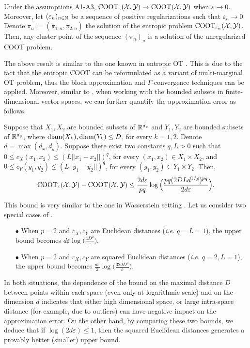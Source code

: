 \begin{proposition} \label{conv_ent_coot}
  Under the assumptions A1-A3, $\text{COOT}_{\varepsilon}(\mathcal X, \mathcal Y) \to \text{COOT}(\mathcal X, \mathcal Y)$
  when $\varepsilon \to 0$. Moreover, let $(\varepsilon_n)_{n \in \mathbb N}$ be a sequence of
  positive regularizations such that $\varepsilon_n \to 0$.
  Denote $\pi_n := (\pi_{1, n}, \pi_{2, n})$ the solution of the entropic problem
  $\text{COOT}_{\varepsilon_n} (\mathcal X, \mathcal Y)$. Then, any cluster point of the sequence $(\pi_n)_n$ is
  a solution of the unregularized COOT problem.
\end{proposition}
The above result is similar to the one known in entropic OT \citep{Carlier17}. This is due to the fact
that the entropic COOT can be reformulated as a variant of multi-marginal OT problem,
thus the block approximation and $\Gamma$-convergence techniques can be applied. Moreover,
similar to \citep{Genevay19}, when working with the bounded subsets in finite-dimensional vector spaces,
we can further quantify the approximation error as follows.
\begin{proposition} \label{prop:quant_bound_ent}
  Suppose that $X_1, X_2$ are bounded subsets of $\mathbb R^{d_x}$ and $Y_1, Y_2$ are bounded subsets
  of $\mathbb R^{d_y}$, where $\text{diam}(X_k), \text{diam}(Y_k) \leq D$, for every $k=1,2$.
  Denote $d = \max(d_x, d_y)$. Suppose there exist two constants $q, L > 0$ such that
  $0 \leq c_X(x_1, x_2) \leq (L \vert\vert x_1 - x_2 \vert\vert)^q$,
  for every $(x_1,x_2) \in X_1 \times X_2$, and
  $0 \leq c_Y(y_1, y_2) \leq (L \vert\vert y_1 - y_2 \vert\vert)^q$,
  for every $(y_1,y_2) \in Y_1 \times Y_2$. Then,
  \begin{equation}
    \text{COOT}_{\varepsilon}(\mathcal X, \mathcal Y) - \text{COOT}(\mathcal X, \mathcal Y) \leq
    \frac{2d \varepsilon}{pq} \log\Big( \frac{pq (2DLd^{1/p})^{pq}}{2d \varepsilon} \Big).
  \end{equation}
\end{proposition}
This bound is very similar to the one in Wasserstein setting \citep{Genevay19}.
Let us consider two special cases of .
\begin{itemize}
  \item[$\bullet$] When $p=2$ and $c_X, c_Y$ are Euclidean distances (\textit{i.e.} $q=L=1$),
  the upper bound becomes $d\varepsilon \log\Big( \frac{4D^2}{\varepsilon} \Big)$.

  \item[$\bullet$] When $p=2$ and $c_X, c_Y$ are squared Euclidean distances
  (\textit{i.e.} $q=2, L=1$), the upper bound becomes
  $\frac{d\varepsilon}{2} \log\Big( \frac{32dD^4}{\varepsilon} \Big)$.
\end{itemize}
In both situations, the dependence of the bound on the maximal distance $D$ between points
within each space (even only at logarithmic scale) and on the dimension $d$ indicates
that either high dimensional space, or large intra-space distance (for example, due to outliers)
can have negative impact on the approximation error. On the other hand,
by comparing these two bounds, we deduce that if $\log(2d \varepsilon) \leq 1$,
then the squared Euclidean distances generates a provably better (smaller) upper bound.

